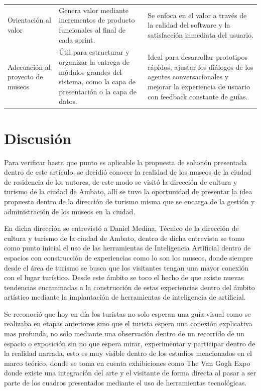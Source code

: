 \documentclass[pdflatex,sn-mathphys-num]{sn-jnl}%
\theoremstyle{thmstyleone}%
\theoremstyle{thmstyletwo}%
\theoremstyle{thmstylethree}%
\begin{document}
\begin{table}[h!]
\begin{tabularx}{\linewidth}{@{} lXX @{}}
Orientación al valor & Genera valor mediante incrementos de producto funcionales al final de cada sprint. & Se enfoca en el valor a través de la calidad del software y la satisfacción inmediata del usuario. \\ \addlinespace

Adecuación al proyecto de museos & Útil para estructurar y organizar la entrega de módulos grandes del sistema, como la capa de presentación o la capa de datos. & Ideal para desarrollar prototipos rápidos, ajustar los diálogos de los agentes conversacionales y mejorar la experiencia de usuario con feedback constante de guías. \\

\bottomrule
\end{tabularx}
\end{table}
\FloatBarrier
\section{Discusión}\label{sec12}

Para verificar hasta que punto es aplicable la propuesta de solución presentada dentro de este artículo, se decidió conocer la realidad de los museos de la ciudad de residencia de los autores, de este modo se visitó la dirección de cultura y turismo de la ciudad de Ambato, allí se tuvo la oportunidad de presentar la idea propuesta dentro de la dirección de turismo misma que se encarga de la gestión y administración de los museos en la ciudad.

En dicha dirección se entrevistó a Daniel Medina, Técnico de la dirección de cultura y turismo de la ciudad de Ambato, dentro de dicha entrevista se tomo como punto inicial el uso de las herramientas de Inteligencia Artificial dentro de espacios con construcción de experiencias como lo son los museos, donde siempre desde el área de turismo se busca que los visitantes tengan una mayor conexión con el lugar turístico. Desde este ámbito se toco el hecho de que existe nuevas tendencias encaminadas a la construcción de estas experiencias dentro del ámbito artístico mediante la implantación de herramientas de inteligencia de artificial.

Se reconoció que hoy en día los turistas no solo esperan una guía visual como se realizaba en etapas anteriores sino que el turista espera una conexión explicativa mas profunda, no solo mediante una observación dentro de un recorrido de un espacio o exposición sin no que espera mirar, experimentar y participar dentro de la realidad narrada, esto es muy visible dentro de los estudios mencionados en el marco teórico, donde se toma en cuenta exhibiciones como The Van Gogh Expo donde existe una integración del arte y el visitante de forma directa al pasar a ser parte de los cuadros presentados mediante el uso de herramientas tecnológicas.
\end{document}
